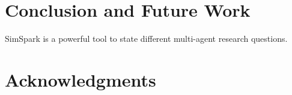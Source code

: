 \documentclass{llncs}
\begin{document}
\section{Conclusion and Future Work}
\label{s:conclusion}
SimSpark is a powerful tool to state different multi-agent research questions.

\section*{Acknowledgments}



\end{document}
